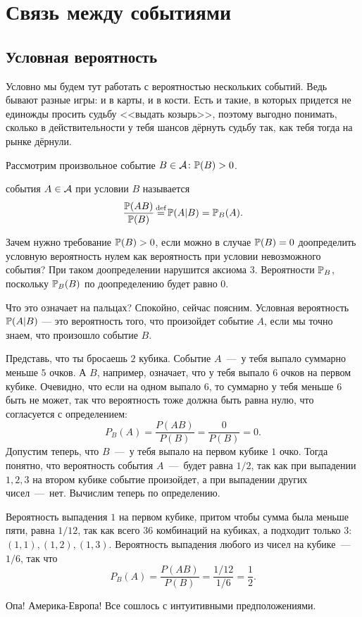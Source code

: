 \documentclass[../TV&MS.tex]{subfiles}
\begin{document}
\section{Связь между событиями}

\subsection{Условная вероятность}

\qquad Условно мы будем тут работать с вероятностью нескольких событий.
Ведь бывают разные игры: и в карты, и в кости. Есть и такие, в которых
придется не единожды просить судьбу <<выдать козырь>>, поэтому выгодно
понимать, сколько в действительности у тебя шансов дёрнуть судьбу так, 
как тебя тогда на рынке дёрнули.

Рассмотрим произвольное событие $B \in \mathcal{A} \colon \mathbb{P}(B) > 0$.
\begin{Def}
 события $A \in \mathcal{A}$ при условии $B$ называется 
$$\frac{\Pro(AB)}{\Pro(B)} \myeq \Pro(A|B) = \Pro_B(A).$$
\end{Def}

\begin{Wtf}
Зачем нужно требование $\mathbb{P}(B) > 0$, если можно в случае $\mathbb{P}(B) = 0$ доопределить 
условную вероятность нулем как вероятность при условии невозможного события?
При таком доопределении нарушится аксиома $3$. Вероятности $\mathbb{P}_B$, поскольку $\mathbb{P}_B(B)$ 
по доопределению будет равно $0$.
\end{Wtf}

Что это означает на пальцах? Спокойно, сейчас поясним. Условная вероятность 
$\mathbb{P}(A|B)$ --- это вероятность того, что произойдет событие $A$, если мы точно знаем, 
что произошло событие $B$.

\begin{Ex}
	Представь, что ты бросаешь $2$ кубика. Событие $A$~---~у тебя выпало суммарно меньше
	$5$ очков. А $B$, например, означает, что у тебя выпало $6$ очков на первом кубике.
	Очевидно, что если на одном выпало $6$, то суммарно у тебя меньше $6$ быть не может,
	так что вероятность тоже должна быть равна нулю, что согласуется с определением:
	$$P_B(A)= \frac{P(AB)}{P(B)}= \frac{0}{P(B)}=0.$$
	Допустим теперь, что $B$~---~у тебя выпало на первом кубике $1$ очко. Тогда понятно, что
	вероятность события $A$~---~будет равна $1/2$, так как при выпадении $1,2,3$ на втором кубике
	событие произойдет, а при выпадении других чисел~---~нет. Вычислим теперь по определению.
	
	Вероятность выпадения $1$ на первом кубике, притом чтобы сумма была меньше пяти, равна
	$1/12$, так как всего $36$ комбинаций на кубиках, а подходит только $3$: $(1,1), (1,2), (1,3)$.
	Вероятность выпадения любого из чисел на кубике~---~$1/6$, так что
	$$P_B(A)= \frac{P(AB)}{P(B)}= \frac{1/12}{1/6}=\frac12.$$
	
	\noindent
	Опа! Америка-Европа! Все сошлось с интуитивными предположениями.	
\end{Ex}
\end{document}
